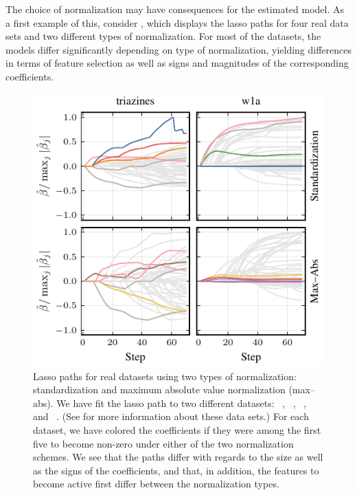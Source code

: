 The choice of normalization may have consequences for the estimated model. As a first
example of this, consider , which displays the lasso paths for
four real data sets and two different types of normalization. For most of the datasets, the
models differ significantly depending on type of normalization, yielding differences in
terms of feature selection as well as signs and magnitudes of the corresponding
coefficients.

\begin{figure}[bpt]
  \centering
  \includegraphics[]{plots/realdata_paths_small.pdf}
  \caption{%
    Lasso paths for real datasets using two types of normalization:
    standardization and maximum absolute value normalization (max--abs). We have fit
    the lasso path to two different datasets:
    ~\citep{harrison1978}, ~\citep{golub1999},
    ~\citep{king}, and ~\citep{platt1998}. (See 
    for more information about these data sets.) For each
    dataset, we have colored the coefficients if they were among the first five
    to become non-zero under either of the two normalization schemes. We see
    that the paths differ with regards to the size as well as the signs of the
    coefficients, and that, in addition, the features to become active first
    differ between the normalization types.
  }
  \label{fig:realdata-paths}
\end{figure}

